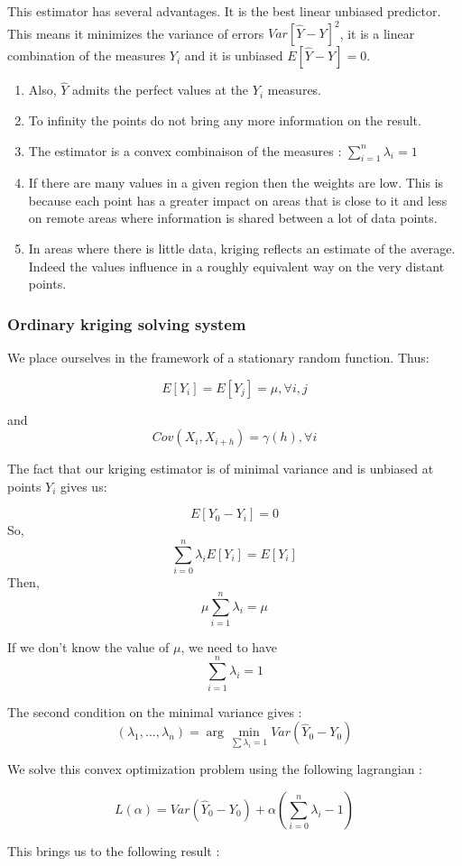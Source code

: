 \documentclass[hidelinks,12pt]{article}
\begin{document}
This estimator has several advantages. It is the best linear unbiased predictor. This means it minimizes the variance of errors $Var[\hat{Y}-Y]^2$, it is a linear combination of the measures $Y_i$ and it is unbiased $E[\hat{Y}-Y]=0$.
\begin{enumerate}
\item Also, $\hat{Y}$ admits the perfect values at the $Y_i$ measures.
\item To infinity the points do not bring any more information on the result.
\item The estimator is a convex combinaison of the measures : $\sum_{i=1}^{n}\lambda_i=1$
\item If there are many values in a given region then the weights are low. This is because each point has a greater impact on areas that is close to it and less on remote areas where information is shared between a lot of data points.
\item In areas where there is little data, kriging reflects an estimate of the average. Indeed the values influence in a roughly equivalent way on the very distant points.
\end{enumerate}

\subsubsection{Ordinary kriging solving system}
We place ourselves in the framework of a stationary random function. Thus:

$$E[Y_i]=E[Y_j]=\mu, \forall i,j$$

and $$Cov(X_i,X_{i+h})=\gamma(h), \forall i$$

The fact that our kriging estimator is of minimal variance and is unbiased at points $Y_i$ gives us:

$$E[Y_0-Y_i]=0$$
So, $$\sum_{i=0}^{n}\lambda_iE[Y_i]=E[Y_i]$$
Then, $$\mu \sum_{i=1}^{n}\lambda_i = \mu$$

If we don't know the value of $\mu$, we need to have $$\sum_{i=1}^{n}\lambda_i=1$$

The second condition on the minimal variance gives : 
$$ (\lambda_1,\ldots,\lambda_n)= \arg\min_{\sum \lambda_i=1} Var(\hat{Y}_0-Y_0)$$

We solve this convex optimization problem using the following lagrangian :

$$L(\alpha)=Var(\hat{Y}_0-Y_0)+\alpha(\sum_{i=0}^{n}\lambda_i-1)$$

This brings us to the following result :
\end{document}
